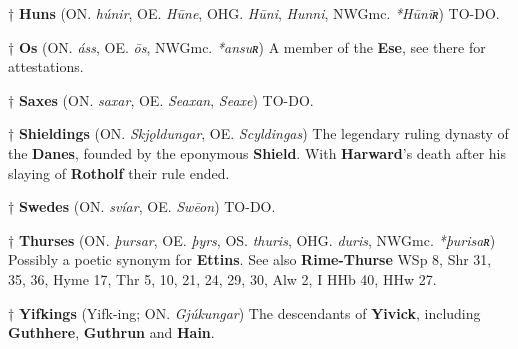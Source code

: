† \textbf{Huns} (ON. \emph{húnir}, OE. \emph{Hūne}, OHG. \emph{Hūni}, \emph{Hunni}, NWGmc. \emph{*Hūnīʀ})
 TO-DO.
 
† \textbf{Os} (ON. \emph{áss}, OE. \emph{ōs}, NWGmc. \emph{*ansuʀ})
 A member of the \textbf{Ese}, see there for attestations.
 
† \textbf{Saxes} (ON. \emph{saxar}, OE. \emph{Seaxan}, \emph{Seaxe})
 TO-DO.
 
† \textbf{Shieldings} (ON. \emph{Skjǫldungar}, OE. \emph{Scyldingas})
 The legendary ruling dynasty of the \textbf{Danes}, founded by the eponymous \textbf{Shield}. With \textbf{Harward}'s death after his slaying of \textbf{Rotholf} their rule ended.

† \textbf{Swedes} (ON. \emph{svíar}, OE. \emph{Swēon})
 TO-DO.

† \textbf{Thurses} (ON. \emph{þursar}, OE. \emph{þyrs}, OS. \emph{thuris}, OHG. \emph{duris}, NWGmc. \emph{*þurisaʀ})
 Possibly a poetic synonym for \textbf{Ettins}. See also \textbf{Rime-Thurse}
 WSp 8, Shr 31, 35, 36, Hyme 17, Thr 5, 10, 21, 24, 29, 30, Alw 2, I HHb 40, HHw 27.

† \textbf{Yifkings} (Yifk-ing; ON. \emph{Gjúkungar})
 The descendants of \textbf{Yivick}, including \textbf{Guthhere}, \textbf{Guthrun} and \textbf{Hain}.
